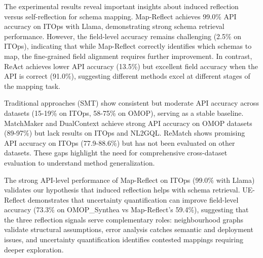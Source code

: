 \documentclass[sigconf, nonacm]{acmart}
\newcommand{\deleted}[1]{\textcolor{red}{#1}}
\begin{document}
The experimental results reveal important insights about induced reflection versus self-reflection for schema mapping. Map-Reflect achieves 99.0\% API accuracy on ITOps with Llama, demonstrating strong schema retrieval performance. However, the field-level accuracy remains challenging (2.5\% on ITOps), indicating that while Map-Reflect correctly identifies which schemas to map, the fine-grained field alignment requires further improvement. In contrast, ReAct achieves lower API accuracy (13.5\%) but excellent field accuracy when the API is correct (91.0\%), suggesting different methods excel at different stages of the mapping task.


Traditional approaches (SMT) show consistent but moderate API accuracy across datasets (15-19\% on ITOps, 58-75\% on OMOP), serving as a stable baseline. MatchMaker and DualContext achieve strong API accuracy on OMOP datasets (89-97\%) but lack results on ITOps and NL2GQL. ReMatch shows promising API accuracy on ITOps (77.9-88.6\%) but has not been evaluated on other datasets. These gaps highlight the need for comprehensive cross-dataset evaluation to understand method generalization.


The strong API-level performance of Map-Reflect on ITOps (99.0\% with Llama) validates our hypothesis that induced reflection helps with schema retrieval. UE-Reflect demonstrates that uncertainty quantification can improve field-level accuracy (73.3\% on OMOP\_Synthea vs Map-Reflect's 59.4\%), suggesting that the three reflection signals serve complementary roles: neighbourhood graphs validate structural assumptions, error analysis catches semantic and deployment issues, and uncertainty quantification identifies contested mappings requiring deeper exploration.
\end{document}
